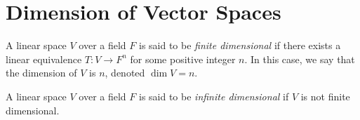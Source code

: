 \documentclass[11pt,fleqn]{book} %
\begin{document}
\newpage

\section{Dimension of Vector Spaces}

\begin{definition}
    A linear space $V$ over a field $F$ is said to be \emph{finite dimensional} if there exists a linear equivalence $T: V \to F^n$ for some positive integer $n$. In this case, we say that the dimension of $V$ is $n$, denoted $\dim V = n$.
\end{definition}

\begin{definition}
    A linear space $V$ over a field $F$ is said to be \emph{infinite dimensional} if $V$ is not finite dimensional.
\end{definition}

\end{document}
